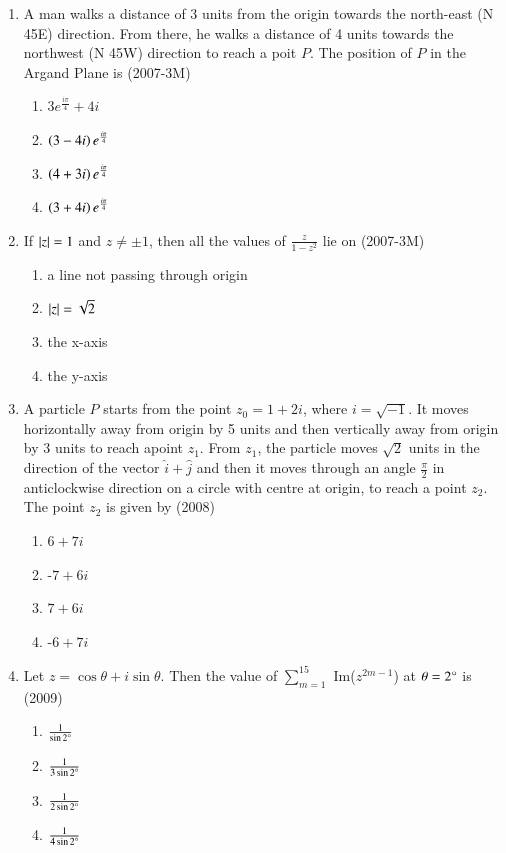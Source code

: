 \documentclass[journal,12pt,twocolumn]{IEEEtran}
\theoremstyle{remark}
\begin{document}
\begin{enumerate}
\item A man walks a distance of 3 units from the origin towards the north-east (N 45\degree E) direction. From there, he walks a distance of 4 units towards the northwest (N 45\degree W) direction to reach a poit $P$. The position of $P$ in the Argand Plane is \hfill{(2007-3M)}
	\begin{multicols}{2}
\begin{enumerate}[label=(\alph*)]
	\item $3e^{\frac{i\pi}{4}}+4i$
	\item $\left(3-4i\right)e^{\frac{i\pi}{4}}$
	\item $\left(4+3i\right)e^{\frac{i\pi}{4}}$
	\item $\left(3+4i\right)e^{\frac{i\pi}{4}}$
\end{enumerate}
	\end{multicols}

\item If $\left\vert z\right\vert=1$ and $z\neq\pm1$, then all the values of $\frac{z}{1-z^{2}}$ lie on \hfill{(2007-3M)}
\begin{enumerate}[label=(\alph*)]
	\item a line not passing through origin
	\item $\left\vert z\right\vert=\sqrt{2}$
	\item the x-axis
	\item the y-axis
\end{enumerate}

\item A particle $P$ starts from the point $z_{0}=1+2i$, where $i=\sqrt{-1}$. It moves horizontally away from origin by 5 units and then vertically away from origin by 3 units to reach apoint $z_{1}$. From $z_{1}$, the particle moves $\sqrt{2}$ units in the direction of the vector $\hat{i}+\hat{j}$ and then it moves through an angle $\frac{\pi}{2}$ in anticlockwise direction on a circle with centre at origin, to reach a point $z_{2}$. The point $z_{2}$ is given by \hfill{(2008)}
	\begin{multicols}{2}
\begin{enumerate}[label=(\alph*)]
	\item $6+7i$
	\item -$7+6i$
	\item $7+6i$
	\item -$6+7i$
\end{enumerate}
	\end{multicols}

\item Let $z=\cos\theta+i\sin\theta$. Then the value of $\sum_{m=1} ^{15}$ Im($z^{2m-1}$) at $\theta=2\degree$ is \hfill{(2009)}
	\begin{multicols}{4}
\begin{enumerate}[label=(\alph*)]
	\item $\frac{1}{\sin 2\degree}$
	\item $\frac{1}{3\sin 2\degree}$
	\item $\frac{1}{2\sin 2\degree}$
	\item $\frac{1}{4\sin 2\degree}$
\end{enumerate}
	\end{multicols}


\end{enumerate}
\end{document}
